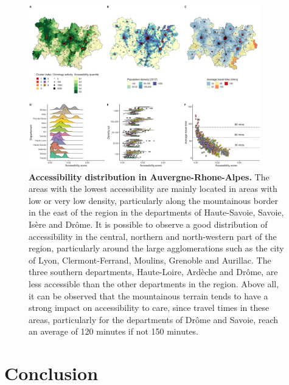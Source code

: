 \begin{figure}[h!]
    \includegraphics[width=0.9\textwidth]{images/camion/region_accessibility/accessibility_Auvergne-Rhone-Alpes.png}
    \centering
    \caption{ \textbf{Accessibility distribution in Auvergne-Rhone-Alpes.} The
        areas with the lowest accessibility are mainly located in areas with low
        or very low density, particularly along the mountainous border in the
        east of the region in the departments of Haute-Savoie, Savoie, Isère and
        Drôme. It is possible to observe a good distribution of accessibility in
        the central, northern and north-western part of the region, particularly
        around the large agglomerations such as the city of Lyon,
        Clermont-Ferrand, Moulins, Grenoble and Aurillac. The three southern
        departments, Haute-Loire, Ardèche and Drôme, are less accessible than
        the other departments in the region. Above all, it can be observed that
        the mountainous terrain tends to have a strong impact on accessibility
        to care, since travel times in these areas, particularly for the
        departments of Drôme and Savoie, reach an average of 120 minutes if not
        150 minutes. }
\end{figure}

\section{Conclusion}

